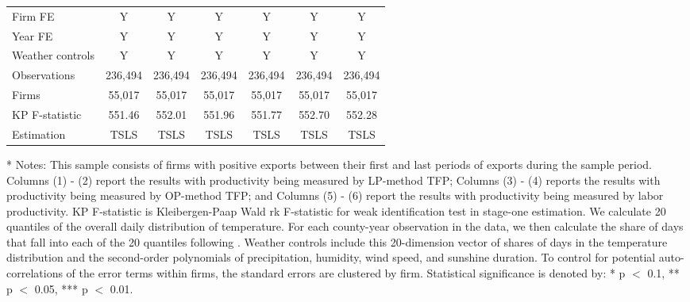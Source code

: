 \documentclass[12pt]{article}
\begin{document}
\begin{table}[H]
{\begin{tabular}{l*{6}{c}}
    Firm FE &Y&Y&Y&Y&Y&Y\\
    Year FE &Y&Y&Y&Y&Y&Y\\
    Weather controls &Y&Y&Y&Y&Y&Y\\
    \hline
    Observations	  &236,494&236,494	&236,494&236,494	&236,494&236,494 \\
    Firms	          &55,017&55,017	&55,017&55,017	&55,017&55,017 \\
    KP F-statistic	&551.46&552.01	&551.96&551.77	&552.70&552.28 \\
    Estimation      &TSLS&TSLS&TSLS&TSLS&TSLS&TSLS\\
    \hline\hline
  \end{tabular}
  }
  \begin{tablenotes}
    \item[*] \small Notes: This sample consists of firms with positive exports between their first and last periods of exports during the sample period. Columns (1) - (2) report the results with productivity being measured by LP-method TFP; Columns (3) - (4) reports the results with productivity being measured by OP-method TFP; and Columns (5) - (6) report the results with productivity being measured by labor productivity.  KP F-statistic is Kleibergen-Paap Wald rk F-statistic for weak identification test in stage-one estimation. We calculate 20 quantiles of the overall daily distribution of temperature. For each county-year observation in the data, we then calculate the share of days that fall into each of the 20 quantiles following \citep{deschenes2017defensive}. Weather controls include this 20-dimension vector of shares of days in the temperature distribution and the second-order polynomials of precipitation, humidity, wind speed, and sunshine duration. To control for potential auto-correlations of the error terms within firms, the standard errors are clustered by firm. Statistical significance is denoted by: * p $<$ 0.1, ** p $<$ 0.05, *** p $<$ 0.01.
  \end{tablenotes}
  \end{table}
\end{document}
